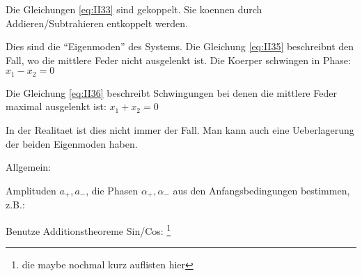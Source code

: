 Die Gleichungen \ref{eq:II33} sind gekoppelt. Sie koennen durch Addieren/Subtrahieren entkoppelt werden.



Dies sind die ``Eigenmoden'' des Systems. Die Gleichung \ref{eq:II35} beschreibnt den Fall, wo die mittlere Feder nicht 
ausgelenkt ist. Die Koerper schwingen in Phase: $x_1 -  x_2 = 0$

Die Gleichung \ref{eq:II36} beschreibt Schwingungen bei denen die mittlere Feder maximal ausgelenkt ist: $x_1 + x_2 = 0$

In der Realitaet ist dies nicht immer der Fall. Man kann auch eine Ueberlagerung der beiden Eigenmoden haben.

Allgemein:


Amplituden $a_+, a_-$, die Phasen $\alpha_+, \alpha_-$ aus den Anfangsbedingungen bestimmen, z.B.:



Benutze Additionstheoreme Sin/Cos: \footnote{die maybe nochmal kurz auflisten hier}

